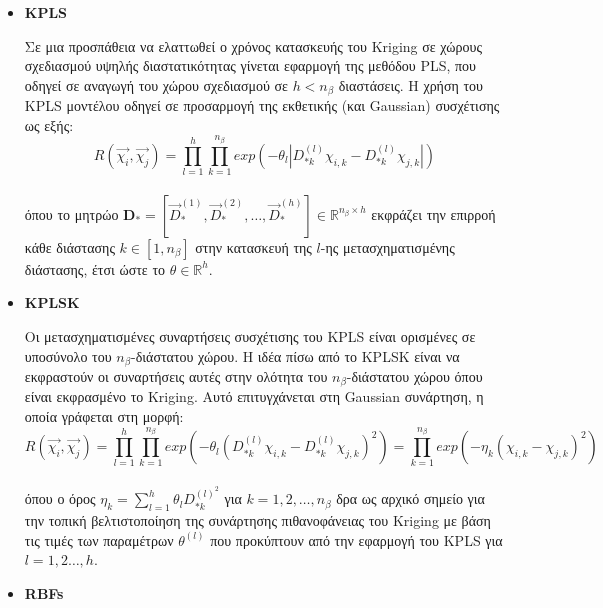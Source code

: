 \documentclass[twoside, 12pt,notitlepage]{report}
\begin{document}
\begin{itemize}
\newpage


\item \textbf{KPLS} 

Σε μια προσπάθεια να ελαττωθεί ο χρόνος κατασκευής του Kriging σε 
χώρους σχεδιασμού υψηλής διαστατικότητας γίνεται εφαρμογή της 
μεθόδου PLS, που οδηγεί σε αναγωγή του χώρου σχεδιασμού σε $h \! <
\!n_{β}$ διαστάσεις. Η χρήση του KPLS μοντέλου οδηγεί σε προσαρμογή 
της εκθετικής (και Gaussian) συσχέτισης ως εξής:
\begin{equation}
R \left( \vec{χ_{i}}, \vec{χ_{j}} \right) = 
\prod_{l=1}^{h} \prod_{k=1}^{n_{β}} exp \left( -\theta_{l} 
\left| D_{*k}^{(l)}χ_{i,k} - D_{*k}^{(l)} χ_{j,k} \right| 
\right)
\end{equation}              
\\
όπου το μητρώο $\mathbf{D}_{*} \!= \![\vec{D}_{*}^{(1)}, \vec{D}
_{*}^{(2)}, \hdots, \vec{D}_{*}^{(h)}] \!\in \mathbb{R}^{n_{β} 
\times h}$ εκφράζει την επιρροή κάθε διάστασης $k \!\in \![1,n_{β}]
$ στην κατασκευή της $l$-ης μετασχηματισμένης διάστασης, έτσι ώστε 
το $θ \! \in \!\mathbb{R}^{h}$.

\item \textbf{KPLSK}

Οι μετασχηματισμένες συναρτήσεις συσχέτισης του KPLS είναι 
ορισμένες σε υποσύνολο του $n_{β}$-διάστατου χώρου. Η ιδέα πίσω από 
το KPLSK είναι να εκφραστούν οι συναρτήσεις αυτές στην ολότητα του 
$n_{β}$-διάστατου χώρου όπου είναι εκφρασμένο το Kriging. Αυτό 
επιτυγχάνεται στη Gaussian συνάρτηση, η οποία γράφεται στη μορφή: 
\begin{equation}
R \left( \vec{χ_{i}},\vec{χ_{j}} \right) 
= \prod_{l=1}^{h} \prod_{k=1}^{n_{β}} exp \left(-
\theta_{l} \left( D_{*k}^{(l)} χ_{i,k} - D_{*k}^{(l)} 
χ_{j,k} \right)^2  \right)
= \prod_{k=1}^{n_{β}}exp \left( 
- η_{k} \left( χ_{i,k} - χ_{j,k} \right)^2 \right)
\end{equation}
\\[-2mm]
όπου ο όρος $η_{k}=\sum_{l=1}^{h} θ_{l} D_{*k}^{(l)^2}$ 
για $k=1,2,\hdots,n_{β}$ δρα ως αρχικό σημείο για την τοπική 
βελτιστοποίηση της συνάρτησης πιθανοφάνειας του Kriging με βάση τις 
τιμές των παραμέτρων $θ^{(l)}$ που προκύπτουν από την εφαρμογή του 
KPLS για $l = 1,2 \hdots, h$. 

\item \textbf{RBFs}


\end{itemize}
\end{document}
